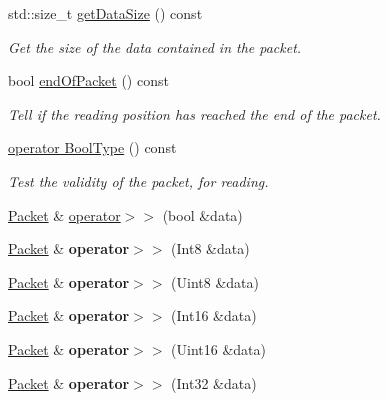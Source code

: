 \begin{DoxyCompactItemize}
std\+::size\+\_\+t \hyperlink{classsf_1_1Packet_a0fae6eccf2ca704fc5099cd90a9f56f7}{get\+Data\+Size} () const
\begin{DoxyCompactList}\small\item\em Get the size of the data contained in the packet. \end{DoxyCompactList}\item 
bool \hyperlink{classsf_1_1Packet_a61e354fa670da053907c14b738839560}{end\+Of\+Packet} () const
\begin{DoxyCompactList}\small\item\em Tell if the reading position has reached the end of the packet. \end{DoxyCompactList}\item 
\hyperlink{classsf_1_1Packet_a8ab20be4a63921b7cb1a4d8ca5c30f75}{operator Bool\+Type} () const
\begin{DoxyCompactList}\small\item\em Test the validity of the packet, for reading. \end{DoxyCompactList}\item 
\hyperlink{classsf_1_1Packet}{Packet} \& \hyperlink{classsf_1_1Packet_af8e26c63ba9bdccd262565ff0d3eeba2}{operator$>$$>$} (bool \&data)
\item 
\mbox{\label{classsf_1_1Packet_a70fd5abb9095b5335b79c0cefd17b222}} 
\hyperlink{classsf_1_1Packet}{Packet} \& {\bfseries operator$>$$>$} (Int8 \&data)
\item 
\mbox{\label{classsf_1_1Packet_aa67738284a7efc16c7594b358ef35510}} 
\hyperlink{classsf_1_1Packet}{Packet} \& {\bfseries operator$>$$>$} (Uint8 \&data)
\item 
\mbox{\label{classsf_1_1Packet_af82d6c4e6d74f2ca39732c1e29f30781}} 
\hyperlink{classsf_1_1Packet}{Packet} \& {\bfseries operator$>$$>$} (Int16 \&data)
\item 
\mbox{\label{classsf_1_1Packet_afd8706f092bc830ebb438aeee9271647}} 
\hyperlink{classsf_1_1Packet}{Packet} \& {\bfseries operator$>$$>$} (Uint16 \&data)
\item 
\mbox{\label{classsf_1_1Packet_ae7b44e79f12d500b63f5dc2a10d78d8c}} 
\hyperlink{classsf_1_1Packet}{Packet} \& {\bfseries operator$>$$>$} (Int32 \&data)
\item 

\end{DoxyCompactItemize}
